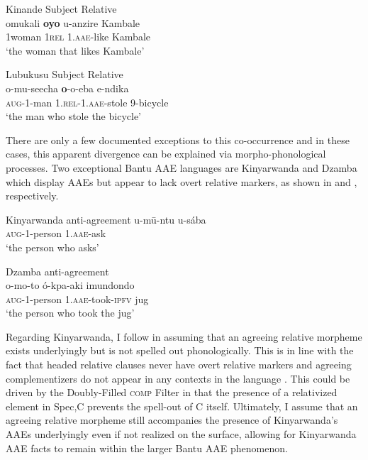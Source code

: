 \documentclass[output=paper,colorlinks,citecolor=brown
]{langscibook}
\begin{document}
\ea \label{ex:myers:kinande} Kinande Subject Relative \citep[417]{SchneiderZioga:2007} \\
\gll omukali {\bfseries  oyo} u-anzire Kambale\\
1woman 1\textsc{rel} \textsc{1.aae}-like Kambale\\
\glt `the woman that likes Kambale' 
\z

\ea \label{ex:myers:lubukusu} Lubukusu Subject Relative \citep[115]{Diercks:2010} \\
\gll o-mu-seecha {\bfseries  o}-o-eba e-ndika\\
\textsc{aug}-1-man 1.\textsc{rel}-\textsc{1.aae}-stole 9-bicycle\\
\glt `the man who stole the bicycle'
\z

There are only a few documented exceptions to this co-occurrence and in these cases, this apparent divergence can be explained via morpho-phonological processes. Two exceptional Bantu AAE languages are Kinyarwanda and Dzamba which display AAEs but appear to lack overt relative markers, as shown in  and , respectively.


\ea \label{ex:myers:rw} Kinyarwanda anti-agreement \citep[235]{ZorcNibagwire:2007}
\gll u-mū-ntu u-sába\\
\textsc{aug}-1-person 1.\textsc{aae}-ask\\
\glt `the person who asks'
\z

\ea \label{ex:myers:dz} Dzamba anti-agreement \citep{Bokamba:1976} \\
\gll o-mo-to ó-kpa-aki imundondo\\
\textsc{aug}-1-person \textsc{1.aae}-took-\textsc{ipfv} jug\\
\glt `the person who took the jug'
\z

Regarding Kinyarwanda, I follow \citet{BHenderson:2013} in assuming that an agreeing relative morpheme exists underlyingly but is not spelled out phonologically. This is in line with the fact that headed relative clauses never have overt relative markers and agreeing complementizers do not appear in any contexts in the language \citep{ZorcNibagwire:2007}. This could be driven by the Doubly-Filled \textsc{comp} Filter \citep{KoopmanSzabolcsi:2000} in that the presence of a relativized element in Spec,C prevents the spell-out of C itself. Ultimately, I assume that an agreeing relative morpheme still accompanies the presence of Kinyarwanda's AAEs underlyingly even if not realized on the surface, allowing for Kinyarwanda AAE facts to remain within the larger Bantu AAE phenomenon.
\end{document}
